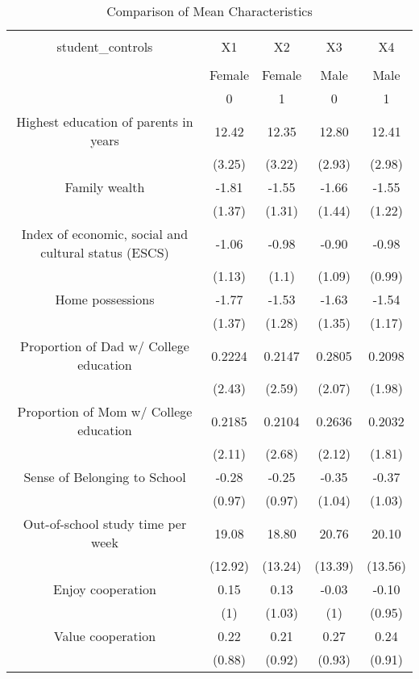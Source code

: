 
\begin{table}[!htbp] \centering 
  \caption{Comparison of Mean Characteristics} 
  \label{Tab1} 
\scriptsize 
\begin{tabular}{@{\extracolsep{5pt}} ccccc} 
\\[-1.8ex]\hline 
\hline \\[-1.8ex] 
student\_controls & X1 & X2 & X3 & X4 \\ 
\hline \\[-1.8ex] 
 & Female & Female & Male & Male \\ 
 & 0 & 1 & 0 & 1 \\ 
Highest education of parents in years  & 12.42 & 12.35 & 12.80 & 12.41 \\ 
 & (3.25) & (3.22) & (2.93) & (2.98) \\ 
Family wealth & -1.81 & -1.55 & -1.66 & -1.55 \\ 
 & (1.37) & (1.31) & (1.44) & (1.22) \\ 
Index of economic, social and cultural status (ESCS) & -1.06 & -0.98 & -0.90 & -0.98 \\ 
 & (1.13) & (1.1) & (1.09) & (0.99) \\ 
Home possessions & -1.77 & -1.53 & -1.63 & -1.54 \\ 
 & (1.37) & (1.28) & (1.35) & (1.17) \\ 
Proportion of Dad w/ College education & 0.2224 & 0.2147 & 0.2805 & 0.2098 \\ 
 & (2.43) & (2.59) & (2.07) & (1.98) \\ 
Proportion of Mom w/ College education & 0.2185 & 0.2104 & 0.2636 & 0.2032 \\ 
 & (2.11) & (2.68) & (2.12) & (1.81) \\ 
Sense of Belonging to School & -0.28 & -0.25 & -0.35 & -0.37 \\ 
 & (0.97) & (0.97) & (1.04) & (1.03) \\ 
Out-of-school study time per week & 19.08 & 18.80 & 20.76 & 20.10 \\ 
 & (12.92) & (13.24) & (13.39) & (13.56) \\ 
Enjoy cooperation &  0.15 &  0.13 & -0.03 & -0.10 \\ 
 & (1) & (1.03) & (1) & (0.95) \\ 
Value cooperation & 0.22 & 0.21 & 0.27 & 0.24 \\ 
 & (0.88) & (0.92) & (0.93) & (0.91) \\ 

\end{tabular}
\end{table}
